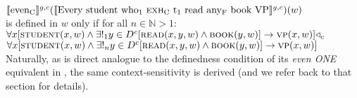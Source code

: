 \xe
\ex
$\intension[g,c]{even\textsubscript{C}}(\intension[g,c]{Every student who\textsubscript{1} {\scshape exh}\textsubscript{C} t\textsubscript{1} read any\textsubscript{F} book VP})(w)$\\is defined in $w$ only if for all $n\in\mathbb{N}>1$:\\$\forall{x}[\predicate{student}(x,w)\land\exists!_1{y\in{D^c}}[\predicate{read}(x,y,w)\land\predicate{book}(y,w)]\rightarrow\predicate{vp}(x,w)]\lprob_c$\\\emptyfill$\forall{x}[\predicate{student}(x,w)\land\exists!_n{y\in{D^c}}[\predicate{read}(x,y,w)\land\predicate{book}(y,w)]\rightarrow\predicate{vp}(x,w)]$
\xe
Naturally, as  is direct analogue to the definedness condition of its \textit{even \MakeUppercase{one}} equivalent in , the same context-sensitivity is derived (and we refer back to that section for details).






